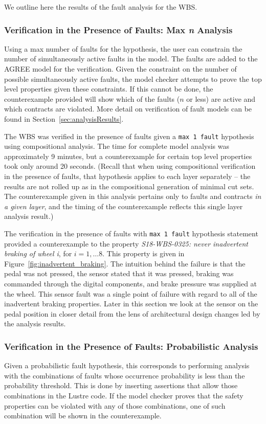 We outline here the results of the fault analysis for the WBS. 

\subsubsection{Verification in the Presence of Faults: Max \textit{n} Analysis}
Using a max number of faults for the hypothesis, the user can constrain the number of simultaneously active faults in the model. The faults are added to the AGREE model for the verification. Given the constraint on the number of possible simultaneously active faults, the model checker attempts to prove the top level properties given these constraints. If this cannot be done, the counterexample provided will show which of the faults ($n$ or less) are active and which contracts are violated. More detail on verification of fault models can be found in Section~\ref{sec:analysisResults}. 

The WBS was verified in the presence of faults given a \texttt{max 1 fault} hypothesis using compositional analysis. The time for complete model analysis was approximately 9 minutes, but a counterexample for certain top level properties took only around 20 seconds. (Recall that when using compositional verification in the presence of faults, that hypothesis applies to each layer separately -- the results are not rolled up as in the compositional generation of minimal cut sets. The counterexample given in this analysis pertains only to faults and contracts \textit{in a given layer}, and the timing of the counterexample reflects this single layer analysis result.) 

The verification in the presence of faults with \texttt{max 1 fault} hypothesis statement provided a counterexample to the property {\em S18-WBS-0325: never inadvertent braking of wheel i}, for $i = 1, \dots 8$. This property is given in Figure~\ref{fig:inadvertent_braking}. The intuition behind the failure is that the pedal was not pressed, the sensor stated that it was pressed, braking was commanded through the digital components, and brake pressure was supplied at the wheel. This sensor fault was a single point of failure with regard to all of the inadvertent braking properties. Later in this section we look at the sensor on the pedal position in closer detail from the lens of architectural design changes led by the analysis results. 

\subsubsection{Verification in the Presence of Faults: Probabilistic Analysis} 
Given a probabilistic fault hypothesis, this corresponds to performing analysis with the combinations of faults whose occurrence probability is less than the probability threshold. This is done by inserting assertions that allow those combinations in the Lustre code. If the model checker proves that the safety properties can be violated with any of those combinations, one of such combination will be shown in the counterexample. 

